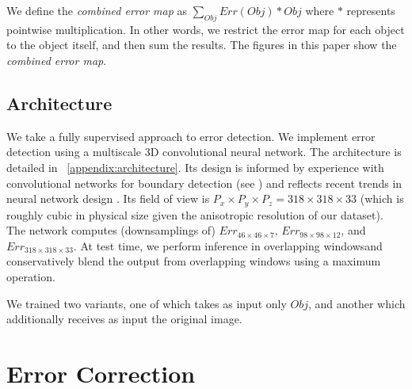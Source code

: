 \documentclass{article}
\begin{document}
We define the \textit{combined error map} as $\sum_{Obj} Err(Obj) * Obj$ where $*$ represents pointwise multiplication. In other words, we restrict the error map for each object to the object itself, and then sum the results. The figures in this paper show the \textit{combined error map}.

\subsection{Architecture}
We take a fully supervised approach to error detection. We implement error detection using a multiscale 3D convolutional neural network. The architecture is detailed in ~\ref{appendix:architecture}. Its design is informed by experience with convolutional networks for boundary detection (see \cite{kisuk}) and reflects recent trends in neural network design \cite{unet,resnet}. Its field of view is $P_x\times P_y\times P_z=318\times 318\times 33$ (which is roughly cubic in physical size given the anisotropic resolution of our dataset). The network computes (downsamplings of) $Err_{46 \times 46 \times 7}$, $Err_{98 \times 98 \times 12}$, and $Err_{318 \times 318 \times 33}$. At test time, we perform inference in overlapping windowsand conservatively blend the output from overlapping windows using a maximum operation.

We trained two variants, one of which takes as input only $Obj$, and another which additionally receives as input the original image. 

\section{Error Correction}
\end{document}
